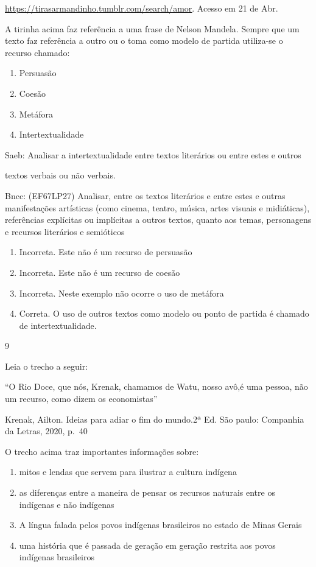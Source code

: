 {{\begin{itemize}
\begin{itemize}
\href{https://tirasarmandinho.tumblr.com/search/amor}{\uline{https://tirasarmandinho.tumblr.com/search/amor}}.
Acesso em 21 de Abr.

A tirinha acima faz referência a uma frase de Nelson Mandela. Sempre que
um texto faz referência a outro ou o toma como modelo de partida
utiliza-se o recurso chamado:

\begin{enumerate}
\def\labelenumi{\alph{enumi})}
\item
  Persuasão
\item
  Coesão
\item
  Metáfora
\item
  Intertextualidade
\end{enumerate}

Saeb: Analisar a intertextualidade entre textos literários ou entre
estes e outros

textos verbais ou não verbais.

Bncc: (EF67LP27) Analisar, entre os textos literários e entre estes e
outras manifestações artísticas (como cinema, teatro, música, artes
visuais e midiáticas), referências explícitas ou implícitas a outros
textos, quanto aos temas, personagens e recursos literários e semióticos

\begin{enumerate}
\def\labelenumi{\arabic{enumi}.}
\item
  Incorreta. Este não é um recurso de persuasão
\item
  Incorreta. Este não é um recurso de coesão
\item
  Incorreta. Neste exemplo não ocorre o uso de metáfora
\item
  Correta. O uso de outros textos como modelo ou ponto de partida é
  chamado de intertextualidade.
\end{enumerate}

\num{9}

Leia o trecho a seguir:

``O Rio Doce, que nós, Krenak, chamamos de Watu, nosso avô,é uma pessoa,
não um recurso, como dizem os economistas''

Krenak, Ailton. Ideias para adiar o fim do mundo.2ª Ed. São paulo:
Companhia da Letras, 2020, p.~40

O trecho acima traz importantes informações sobre:

\begin{enumerate}
\def\labelenumi{\alph{enumi})}
\item
  mitos e lendas que servem para ilustrar a cultura indígena
\item
  as diferenças entre a maneira de pensar os recursos naturais entre os
  indígenas e não indígenas
\item
  A língua falada pelos povos indígenas brasileiros no estado de Minas
  Gerais
\item
  uma história que é passada de geração em geração restrita aos povos
  indígenas brasileiros
\end{enumerate}


\end{itemize}
\end{itemize}}}
